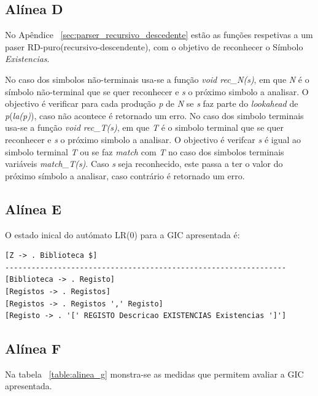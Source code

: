 \subsection{Alínea D} %
\label{sub:alinea_d}

No Apêndice ~\ref{sec:parser_recursivo_descedente} estão as funções respetivas a um paser RD-puro(recursivo-descendente), com o objetivo de reconhecer o Símbolo \emph{Existencias}.

No caso dos simbolos não-terminais usa-se a função \emph{void rec\_N(s)}, em que \emph{N} é o símbolo não-terminal que se quer reconhecer e \emph{s} o próximo simbolo a analisar. O objectivo é verificar para cada produção \emph{p} de \emph{N} se \emph{s} faz parte do \emph{lookahead} de \emph{p}(\emph{la(p)}), caso não acontece é retornado um erro.
No caso dos simbolo terminais usa-se a função \emph{void rec\_T(s)}, em que \emph{T} é o simbolo terminal que se quer reconhecer e \emph{s} o próximo simbolo a analisar. O objectivo é verifcar \emph{s} é igual ao simbolo terminal \emph{T} ou se faz \emph{match} com \emph{T} no caso dos simbolos terminais variáveis \emph{match\_T(s)}. Caso \emph{s} seja reconhecido, este passa a ter o valor do próximo símbolo a analisar, caso contrário é retornado um erro.



\subsection{Alínea E} %
\label{sub:alinea_e}

O estado inical do autómato LR(0) para a GIC apresentada é:

\begin{verbatim}
[Z -> . Biblioteca $]
----------------------------------------------------------------
[Biblioteca -> . Registo]
[Registos -> . Registos]
[Registos -> . Registos ',' Registo]
[Registo -> . '[' REGISTO Descricao EXISTENCIAS Existencias ']']
\end{verbatim}

\subsection{Alínea F} %
\label{sub:alinea_f}

Na tabela ~\ref{table:alinea_g} monstra-se as medidas que permitem avaliar a GIC apresentada.


